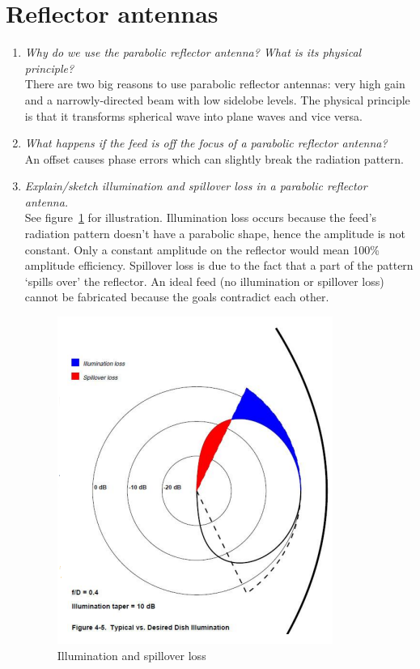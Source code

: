 \documentclass[11pt,a4paper]{article}
\begin{document}
\section{Reflector antennas}
\begin{enumerate}
    \item \emph{Why do we use the parabolic reflector antenna? What is its physical principle?}\\
    There are two big reasons to use parabolic reflector antennas: very high gain and a narrowly-directed beam with low sidelobe levels. The physical principle is that it transforms spherical wave into plane waves and vice versa.

    \item \emph{What happens if the feed is off the focus of a parabolic reflector antenna?}\\
    An offset causes phase errors which can slightly break the radiation pattern.
    
    \item \emph{Explain/sketch illumination and spillover loss in a parabolic reflector antenna.}\\
    See figure~\ref{fig:losses-in-reflector-antennas} for illustration. Illumination loss occurs because the feed's radiation pattern doesn't have a parabolic shape, hence the amplitude is not constant. Only a constant amplitude on the reflector would mean 100\% amplitude efficiency. Spillover loss is due to the fact that a part of the pattern `spills over' the reflector. An ideal feed (no illumination or spillover loss) cannot be fabricated because the goals contradict each other.
    \begin{figure}[!ht]
        \centering
        \includegraphics[width=.4\textwidth]{src/losses-in-reflector-antennas.png}
        \caption{\label{fig:losses-in-reflector-antennas}Illumination and spillover loss}
    \end{figure}
    

\end{enumerate}
\end{document}
